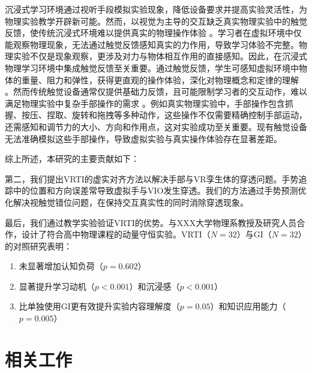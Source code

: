 \documentclass[runningheads]{llncs}
\begin{document}
沉浸式学习环境通过视听手段模拟实验现象，降低设备要求并提高实验灵活性，为物理实验教学开辟新可能。然而，以视觉为主导的交互缺乏真实物理实验中的触觉反馈，使传统沉浸式环境难以提供真实的物理操作体验 \cite{giri2021application}。学习者在虚拟环境中仅能观察物理现象，无法通过触觉反馈感知真实的力作用，导致学习体验不完整。物理实验不仅是现象观察，更涉及对力与物体相互作用的直接感知。因此，在沉浸式物理学习环境中集成触觉反馈至关重要。通过触觉反馈，学生可感知虚拟环境中物体的重量、阻力和弹性，获得更直观的操作体验，深化对物理概念和定律的理解 \cite{minaker2016handson}。然而传统触觉设备通常仅提供基础力反馈，且可能限制学习者的交互动作，难以满足物理实验中复杂手部操作的需求 \cite{bonfert2023challenges}。例如真实物理实验中，手部操作包含抓握、按压、捏取、旋转和拖拽等多种动作，这些操作不仅需要精确控制手部运动，还需感知和调节力的大小、方向和作用点，这对实验成功至关重要。现有触觉设备无法准确模拟这些手部操作，导致虚拟实验与真实操作体验存在显著差距。

综上所述，本研究的主要贡献如下：


第二，我们提出VRTI的虚实对齐方法以解决手部与VR孪生体的穿透问题。手势追踪中的位置和方向误差常导致虚拟手与VIO发生穿透。我们的方法通过手势预测优化解决视触觉错位问题，在保持交互真实性的同时消除穿透现象。

最后，我们通过教学实验验证VRTI的优势。与XXX大学物理系教授及研究人员合作，设计了符合高中物理课程的动量守恒实验。VRTI（$N=32$）与GI（$N=32$）的对照研究表明：
\begin{enumerate}
  \item 未显著增加认知负荷（$p = 0.602$）
  \item 显著提升学习动机（$p < 0.001$）和沉浸感（$p < 0.001$）
  \item 比单独使用GI更有效提升实验内容理解度（$p = 0.05$）和知识应用能力（$p = 0.005$）
\end{enumerate}

\section{相关工作}
\subsection{}
\subsection{}
\end{document}
